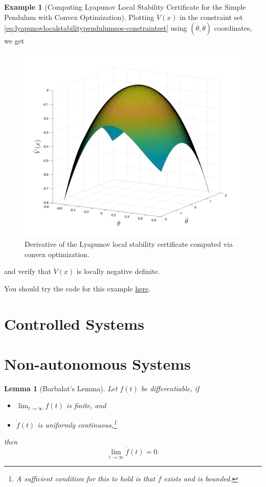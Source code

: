 \documentclass[
]{book}
\newtheorem{lemma}{Lemma}[chapter]
\theoremstyle{definition}
\theoremstyle{definition}
\newtheorem{example}{Example}[chapter]
\theoremstyle{definition}
\theoremstyle{definition}
\theoremstyle{remark}
\begin{document}
\begin{example}[Computing Lyapunov Local Stability Certificate for the Simple Pendulum with Convex Optimization]
Plotting \(\dot{V}(x)\) in the constraint set \eqref{eq:lyapunovlocalstabilitypendulumsos-constraintset} using \((\theta, \dot{\theta})\) coordinates, we get

\begin{figure}

{\centering \includegraphics[width=0.6\linewidth]{images/pendulum-local-lyapunov-certificate-Vdot} 

}

\caption{Derivative of the Lyapunov local stability certificate computed via convex optimization.}\label{fig:lyapunov-local-certificate-pendulum-Vdot}
\end{figure}

and verify that \(\dot{V}(x)\) is locally negative definite.

You should try the code for this example \href{https://github.com/ComputationalRobotics/OptimalControlEstimation-Examples/blob/main/pendulum_local_lyapunov_certificate.m}{here}.
\end{example}

\hypertarget{controlled-systems}{%
\section{Controlled Systems}\label{controlled-systems}}

\hypertarget{non-autonomous-systems}{%
\section{Non-autonomous Systems}\label{non-autonomous-systems}}

\begin{lemma}[Barbalat's Lemma]
\protect\hypertarget{lem:Barbalat}{}\label{lem:Barbalat}Let \(f(t)\) be differentiable, if

\begin{itemize}
\item
  \(\lim_{t \rightarrow \infty} f(t)\) is finite, and
\item
  \(\dot{f}(t)\) is uniformly continuous,\footnote{A sufficient condition for this to hold is that \(\ddot{f}\) exists and is bounded.}
\end{itemize}

then
\[
\lim_{t \rightarrow \infty} \dot{f}(t) = 0.
\]
\end{lemma}
\end{document}
